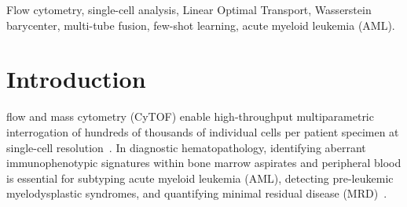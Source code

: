 \documentclass[10pt,journal,compsoc]{IEEEtran}
\begin{document}
{\begin{IEEEkeywords}
Flow cytometry, single-cell analysis, Linear Optimal Transport, Wasserstein barycenter, multi-tube fusion, few-shot learning, acute myeloid leukemia (AML).
\end{IEEEkeywords}}

\maketitle
\IEEEdisplaynontitleabstractindextext
\IEEEpeerreviewmaketitle

\section{Introduction}
 flow and mass cytometry (CyTOF) enable high-throughput multiparametric interrogation of hundreds of thousands of individual cells per patient specimen at single-cell resolution~\cite{spitzer2016mass,saeys2016computational}. In diagnostic hematopathology, identifying aberrant immunophenotypic signatures within bone marrow aspirates and peripheral blood is essential for subtyping acute myeloid leukemia (AML), detecting pre-leukemic myelodysplastic syndromes, and quantifying minimal residual disease (MRD)~\cite{dohner2022diagnosis,wood2020standardized}. 
\end{document}
